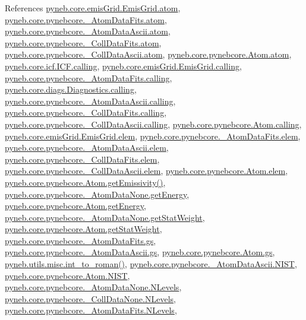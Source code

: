 References \hyperlink{emis_grid_8py_source_l00048}{pyneb.\+core.\+emis\+Grid.\+Emis\+Grid.\+atom}, \hyperlink{pynebcore_8py_source_l00082}{pyneb.\+core.\+pynebcore.\+\_\+\+Atom\+Data\+Fits.\+atom}, \hyperlink{pynebcore_8py_source_l00303}{pyneb.\+core.\+pynebcore.\+\_\+\+Atom\+Data\+Ascii.\+atom}, \hyperlink{pynebcore_8py_source_l00559}{pyneb.\+core.\+pynebcore.\+\_\+\+Coll\+Data\+Fits.\+atom}, \hyperlink{pynebcore_8py_source_l00909}{pyneb.\+core.\+pynebcore.\+\_\+\+Coll\+Data\+Ascii.\+atom}, \hyperlink{pynebcore_8py_source_l01164}{pyneb.\+core.\+pynebcore.\+Atom.\+atom}, \hyperlink{icf_8py_source_l00016}{pyneb.\+core.\+icf.\+I\+C\+F.\+calling}, \hyperlink{emis_grid_8py_source_l00041}{pyneb.\+core.\+emis\+Grid.\+Emis\+Grid.\+calling}, \hyperlink{pynebcore_8py_source_l00090}{pyneb.\+core.\+pynebcore.\+\_\+\+Atom\+Data\+Fits.\+calling}, \hyperlink{diags_8py_source_l00169}{pyneb.\+core.\+diags.\+Diagnostics.\+calling}, \hyperlink{pynebcore_8py_source_l00311}{pyneb.\+core.\+pynebcore.\+\_\+\+Atom\+Data\+Ascii.\+calling}, \hyperlink{pynebcore_8py_source_l00568}{pyneb.\+core.\+pynebcore.\+\_\+\+Coll\+Data\+Fits.\+calling}, \hyperlink{pynebcore_8py_source_l00918}{pyneb.\+core.\+pynebcore.\+\_\+\+Coll\+Data\+Ascii.\+calling}, \hyperlink{pynebcore_8py_source_l01175}{pyneb.\+core.\+pynebcore.\+Atom.\+calling}, \hyperlink{emis_grid_8py_source_l00045}{pyneb.\+core.\+emis\+Grid.\+Emis\+Grid.\+elem}, \hyperlink{pynebcore_8py_source_l00083}{pyneb.\+core.\+pynebcore.\+\_\+\+Atom\+Data\+Fits.\+elem}, \hyperlink{pynebcore_8py_source_l00304}{pyneb.\+core.\+pynebcore.\+\_\+\+Atom\+Data\+Ascii.\+elem}, \hyperlink{pynebcore_8py_source_l00560}{pyneb.\+core.\+pynebcore.\+\_\+\+Coll\+Data\+Fits.\+elem}, \hyperlink{pynebcore_8py_source_l00910}{pyneb.\+core.\+pynebcore.\+\_\+\+Coll\+Data\+Ascii.\+elem}, \hyperlink{pynebcore_8py_source_l01165}{pyneb.\+core.\+pynebcore.\+Atom.\+elem}, \hyperlink{pynebcore_8py_source_l01716}{pyneb.\+core.\+pynebcore.\+Atom.\+get\+Emissivity()}, \hyperlink{pynebcore_8py_source_l00059}{pyneb.\+core.\+pynebcore.\+\_\+\+Atom\+Data\+None.\+get\+Energy}, \hyperlink{pynebcore_8py_source_l01200}{pyneb.\+core.\+pynebcore.\+Atom.\+get\+Energy}, \hyperlink{pynebcore_8py_source_l00058}{pyneb.\+core.\+pynebcore.\+\_\+\+Atom\+Data\+None.\+get\+Stat\+Weight}, \hyperlink{pynebcore_8py_source_l01199}{pyneb.\+core.\+pynebcore.\+Atom.\+get\+Stat\+Weight}, \hyperlink{pynebcore_8py_source_l00130}{pyneb.\+core.\+pynebcore.\+\_\+\+Atom\+Data\+Fits.\+gs}, \hyperlink{pynebcore_8py_source_l00406}{pyneb.\+core.\+pynebcore.\+\_\+\+Atom\+Data\+Ascii.\+gs}, \hyperlink{pynebcore_8py_source_l01203}{pyneb.\+core.\+pynebcore.\+Atom.\+gs}, \hyperlink{misc_8py_source_l00013}{pyneb.\+utils.\+misc.\+int\+\_\+to\+\_\+roman()}, \hyperlink{pynebcore_8py_source_l00385}{pyneb.\+core.\+pynebcore.\+\_\+\+Atom\+Data\+Ascii.\+N\+I\+S\+T}, \hyperlink{pynebcore_8py_source_l01211}{pyneb.\+core.\+pynebcore.\+Atom.\+N\+I\+S\+T}, \hyperlink{pynebcore_8py_source_l00062}{pyneb.\+core.\+pynebcore.\+\_\+\+Atom\+Data\+None.\+N\+Levels}, \hyperlink{pynebcore_8py_source_l00075}{pyneb.\+core.\+pynebcore.\+\_\+\+Coll\+Data\+None.\+N\+Levels}, \hyperlink{pynebcore_8py_source_l00155}{pyneb.\+core.\+pynebcore.\+\_\+\+Atom\+Data\+Fits.\+N\+Levels}, 